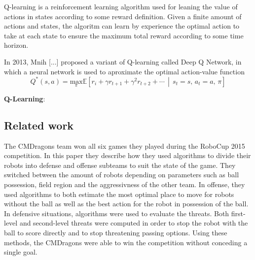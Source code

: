 Q-learning is a reinforcement learning algorithm used for leaning the value of actions in states according to some reward definition. Given a finite amount of actions and states, the algoritm can learn by experience the optimal action to take at each state to ensure the maximum total reward according to some time horizon.

In 2013, Mnih [...] proposed a variant of Q-learning called Deep Q Network, in which a neural network is used to aproximate the optimal action-value function
\begin{equation}
    Q^*(s,a)=\underset \pi {\text{max}} \mathbb{E}\left[ r_i+\gamma r_{t+1}+\gamma^2 r_{t+2}+\cdots \,\middle|\, s_t=s,\,a_t=a,\,\pi \right]
\end{equation}



\textbf{Q-Learning}:
\subsection{Related work}
The CMDragons \cite{CMDragons2015} team won all six games they played during the RoboCup 2015 competition. In this paper they describe how they used algorithms to divide their robots into defense and offense subteams to suit the state of the game. They switched between the amount of robots depending on parameters such as ball possession, field region and the aggressivness of the other team. In offense, they used algorithms to both estimate the most optimal place to move for robots without the ball as well as the best action for the robot in possession of the ball. In defensive situations, algorithms were used to evaluate the threats. Both first-level and second-level threats were computed in order to stop the robot with the ball to score directly and to stop threatening passing options. Using these methods, the CMDragons were able to win the competition without conceding a single goal.
